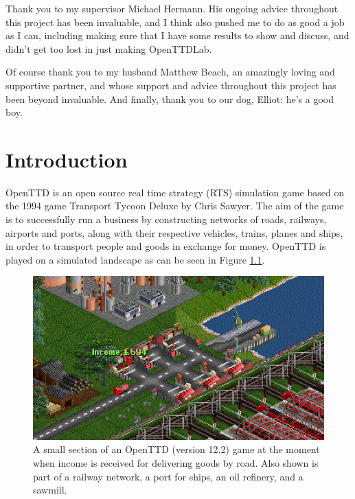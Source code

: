 \documentclass[logo,msc,dsti]{infthesis}    %
\begin{document}
\begin{preliminary}
\begin{acknowledgements}
Thank you to my supervisor Michael Hermann. His ongoing advice throughout this project has been invaluable, and I think also pushed me to do as good a job as I can, including making sure that I have some results to show and discuss, and didn't get too lost in just making OpenTTDLab.

Of course thank you to my husband Matthew Beach, an amazingly loving and supportive partner, and whose support and advice throughout this project has been beyond invaluable. And finally, thank you to our dog, Elliot: he's a good boy.

\end{acknowledgements}


\tableofcontents
\end{preliminary}


\chapter{Introduction}

OpenTTD \cite{openttd} is an open source real time strategy (RTS) simulation game based on the 1994 game Transport Tycoon Deluxe by Chris Sawyer. The aim of the game is to successfully run a business by constructing networks of roads, railways, airports and ports, along with their respective vehicles, trains, planes and ships, in order to transport people and goods in exchange for money. OpenTTD is played on a simulated landscape as can be seen in Figure \ref{fig:openttd}.

\begin{figure}[h]
\centering
\includegraphics[width=\columnwidth]{assets/openttd-screenshot.png}
\caption{A small section of an OpenTTD (version 12.2) game at the moment when income is received for delivering goods by road. Also shown is part of a railway network, a port for ships, an oil refinery, and a sawmill.}
\label{fig:openttd}
\end{figure}
\end{document}

